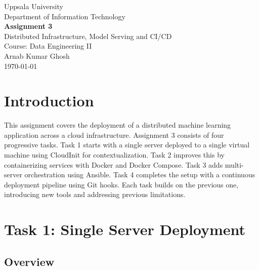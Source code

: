 \documentclass[11pt,a4paper]{article}
\begin{document}
\begin{titlepage}
  \centering
  \vspace*{2cm}
  {\large Uppsala University\\[0.3em]
   Department of Information Technology\\[2cm]}
  {\LARGE\bfseries Assignment 3\\[0.5em]}
  {\Large Distributed Infrastructure, Model Serving and CI/CD\\[2cm]}
  {\large Course: Data Engineering II\\[1.5cm]}
  {\normalsize Arnab Kumar Ghosh\\[0.5cm]}
  {\normalsize \today\\[3cm]}
  \vfill
\end{titlepage}

\tableofcontents
\newpage

\section{Introduction}

This assignment covers the deployment of a distributed machine learning application
across a cloud infrastructure. Assignment 3 consists of four progressive tasks.
Task 1 starts with a single server deployed to a single virtual machine using CloudInit for contextualization.
Task 2 improves this by containerizing services with Docker and Docker Compose.
Task 3 adds multi-server orchestration using Ansible.
Task 4 completes the setup with a continuous deployment pipeline using Git hooks.
Each task builds on the previous one, introducing new tools and addressing
previous limitations.

\section{Task 1: Single Server Deployment}

\subsection{Overview}
\end{document}
